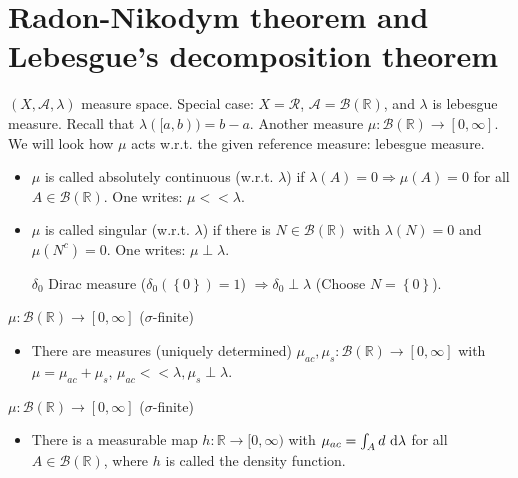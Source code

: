 \documentclass[../../note.tex]{subfiles}
\begin{document}
\section{Radon-Nikodym theorem and Lebesgue's decomposition theorem}
$(X, \mathcal{A}, \lambda)$ measure space. Special case: $X = \mathcal{R}$, $\mathcal{A} = \mathcal{B}(\mathbb{R})$, and $\lambda$ is lebesgue measure. Recall that $\lambda([a,b)) = b - a$.  Another measure $\mu: \mathcal{B}(\mathbb{R}) \rightarrow [0, \infty]$. We will look how $\mu$ acts w.r.t. the given reference measure: lebesgue measure.

\begin{definition}
    \begin{itemize}
        \item $\mu$ is called absolutely continuous (w.r.t. $\lambda$) if $\lambda(A) = 0 \Longrightarrow \mu(A) = 0$ for all $A \in \mathcal{B}(\mathbb{R})$. One writes: $\mu << \lambda$.
        \item $\mu$ is called singular (w.r.t. $\lambda$) if there is $N \in \mathcal{B}(\mathbb{R})$ with $\lambda(N) = 0$ and $\mu(N^c) = 0$. One writes: $\mu \perp \lambda$.
        \begin{example}
            $\delta_0$ Dirac measure ($\delta_0(\left\{0\right\}) = 1$) $\Longrightarrow \delta_0 \perp \lambda$ (Choose $N = \left\{ 0 \right\}$).
        \end{example}
    \end{itemize}
\end{definition}

\begin{theorem}
    $\mu: \mathcal{B}(\mathbb{R}) \rightarrow [0, \infty]$ ($\sigma$-finite)
    \begin{itemize}
        \item There are measures (uniquely determined) $\mu_{ac}, \mu_s: \mathcal{B}(\mathbb{R}) \rightarrow [0, \infty]$ with $\mu = \mu_{ac} + \mu_s$, $\mu_{ac} << \lambda, \mu_s \perp \lambda$.
    \end{itemize}
\end{theorem}

\begin{theorem}
    $\mu: \mathcal{B}(\mathbb{R}) \rightarrow [0, \infty]$ ($\sigma$-finite)
    \begin{itemize}
        \item There is a measurable map $h: \mathbb{R} \rightarrow [0, \infty)$ with $\mu_{ac} = \int_A d~{\rm d} \lambda$ for all $A \in \mathcal{B}(\mathbb{R})$, where $h$ is called the density function.
    \end{itemize}
\end{theorem}
\end{document}

